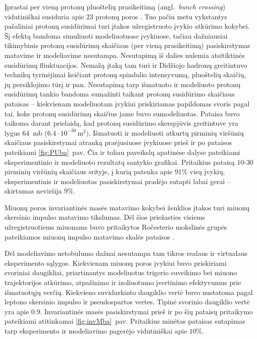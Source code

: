 \documentclass[a4paper, 12pt, oneside]{article}
\begin{document}
Įprastai per vieną protonų pluoštelių prasikeitimą (angl.\ \textit{bunch crossing}) vidutiniškai susiduria
apie 23 protonų poros \cite{CMSLumi}.
Tuo pačiu metu vykstantys pašaliniai protonų susidūrimai turi įtakos užregistruoto įvykio atkūrimo kokybei.
Šį efektą bandoma simuliuoti modeliuotuose įvykiuose, tačiau dažniausiai tikimybinis protonų susidūrimų
skaičiaus (per vieną prasikeitimą) pasiskirstymas matavime ir modeliavime nesutampa.
Nesutapimą iš dalies nulemia atsitiktinės susidūrimų fliuktuacijos.
Nemažą įtaką tam turi ir Didžiojo hadronų greitintuvo technikų tyrinėjimai keičiant protonų spindulio intensyvumą,
pluoštelių skaičių, jų persiklojimo tūrį ir pan.
Nesutapimą tarp išmatuoto ir modeliuoto protonų susidūrimų tankio bandoma sumažinti taikant protonų susidūrimo
skaičiaus pataisas -- kiekvienam modeliuotam įvykiui priskiriamas papildomas svoris pagal tai, koks protonų
susidūrimų skaičius jame buvo sumodeliuotas.
Pataisa buvo taikoma darant prielaidą, kad protonų susidūrimo skerspjūvis greitintuve yra lygus $64$~mb
($6.4 \cdot 10^{-30} \, \mathrm{m}^2)$.
Išmatuoti ir modeliuoti atkurtų pirminių viršūnių skaičiaus pasiskirstymai atranką praėjusiuose įvykiuose
prieš ir po pataisos pateikiami \ref{fig:PUba}~pav.
Čia ir toliau paveikslų apatinėse dalyse pateikiami eksperimentinio ir modeliuoto rezultatų santykio grafikai.
Pritaikius pataisą $10$-$30$ pirminių viršūnių skaičiaus srityje, į kurią patenka apie $91\%$ visų įvykių,
eksperimentinis ir modeliuotas pasiskirstymai pradėjo sutapti labai gerai -- skirtumas neviršija $9\%$.

Miuonų poros invariantinės masės matavimo kokybei ženklios įtakos turi miuonų skersinio impulso matavimo tikslumas.
Dėl šios priežasties visiems užregistruotiems miuonams buvo pritaikytos Ročesterio mokslinės grupės pateikiamos
miuonų impulso matavimo skalės pataisos \cite{RocCorr}.

Dėl modeliavimo netobulumo dažnai nesutampa tam tikros realaus ir virtualaus eksperimento sąlygos.
Kiekvienam miuonų poros įvykiui buvo priskiriami svoriniai daugikliai, priartinantys modeliuotus trigerio
suveikimo bei miuono trajektorijos atkūrimo, atpažinimo ir izoliuotumo įvertinimo efektyvumus prie išmatuotųjų verčių.
Kiekvieno suvidurkinto daugiklio vertė buvo nustatoma pagal leptono skersinio impulso ir pseudospartos vertes.
Tipinė svorinio daugiklio vertė yra apie $0.9$.
Invariantinės masės pasiskirstymai prieš ir po šių pataisų pritaikymo pateikiami atitinkamai \ref{fig:invMba}~pav.
Pritaikius minėtas pataisas sutapimas tarp eksperimento ir modeliavimo pagerėjo vidutiniškai apie $10\%$.
\end{document}
